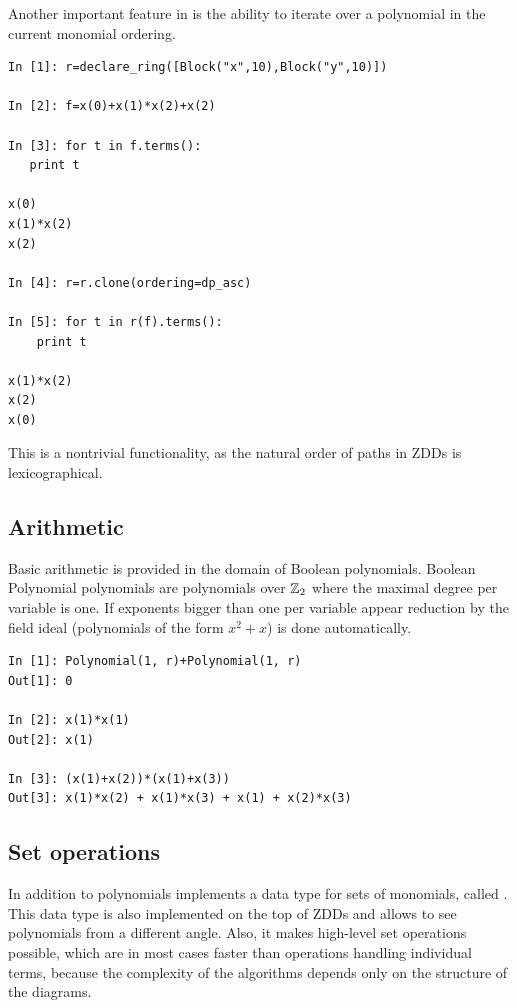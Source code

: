 Another important feature in \PolyBoRi is the ability to iterate over a polynomial in the current monomial ordering.

\begin{lstlisting}
In [1]: r=declare_ring([Block("x",10),Block("y",10)])

In [2]: f=x(0)+x(1)*x(2)+x(2)

In [3]: for t in f.terms():
   print t
   
x(0)
x(1)*x(2)
x(2)

In [4]: r=r.clone(ordering=dp_asc)

In [5]: for t in r(f).terms():
    print t

x(1)*x(2)
x(2)
x(0)
\end{lstlisting}
%
This is a nontrivial functionality, as the natural order of paths in ZDDs is lexicographical.


\subsection{Arithmetic}
Basic arithmetic is provided in the domain of Boolean polynomials. Boolean Polynomial polynomials are polynomials over $\mathbb{Z}_2$ where the maximal degree per variable is one.
If exponents bigger than one per variable appear reduction by the field ideal (polynomials of the form $x^2+x$) is done automatically.
\begin{lstlisting}
In [1]: Polynomial(1, r)+Polynomial(1, r)
Out[1]: 0

In [2]: x(1)*x(1)
Out[2]: x(1)

In [3]: (x(1)+x(2))*(x(1)+x(3))
Out[3]: x(1)*x(2) + x(1)*x(3) + x(1) + x(2)*x(3)
\end{lstlisting}

\subsection{Set operations}
In addition to polynomials  \PolyBoRi implements a data type for sets of monomials, called .
This data type is also implemented on the top of ZDDs and allows to see
polynomials
from a different angle. Also, it makes high-level set operations possible, which are in most cases faster than operations handling individual terms, because the complexity of the algorithms depends only on the structure of the diagrams.

